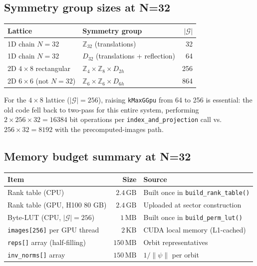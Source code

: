 \documentclass[11pt,a4paper]{article}
\begin{document}
\subsection{Symmetry group sizes at N=32}

\begin{center}
\begin{tabular}{@{}llr@{}}
\toprule
Lattice & Symmetry group & $|\mathcal{G}|$ \\
\midrule
1D chain $N=32$ & $\mathbb{Z}_{32}$ (translations) & 32 \\
1D chain $N=32$ & $D_{32}$ (translations + reflection) & 64 \\
2D $4\times8$ rectangular & $\mathbb{Z}_4\times\mathbb{Z}_8\times D_{2h}$ & 256 \\
2D $6\times6$ (not $N=32$) & $\mathbb{Z}_6\times\mathbb{Z}_6\times D_{6h}$ & 864 \\
\bottomrule
\end{tabular}
\end{center}

For the $4\times8$ lattice ($|\mathcal{G}|=256$), raising \texttt{kMaxGGpu}
from 64 to 256 is essential: the old code fell back to two-pass for this
entire system, performing $2\times256\times32 = 16384$ bit operations per
\texttt{index\_and\_projection} call vs.\ $256\times32 = 8192$ with the
precomputed-images path.

\subsection{Memory budget summary at N=32}

\begin{center}
\begin{tabular}{@{}lrl@{}}
\toprule
Item & Size & Source \\
\midrule
Rank table (CPU) & $2.4\,\mathrm{GB}$ & Built once in \texttt{build\_rank\_table()} \\
Rank table (GPU, H100 80 GB) & $2.4\,\mathrm{GB}$ & Uploaded at sector construction \\
Byte-LUT (CPU, $|\mathcal{G}|=256$) & $1\,\mathrm{MB}$ & Built once in \texttt{build\_perm\_lut()} \\
\texttt{images[256]} per GPU thread & $2\,\mathrm{KB}$ & CUDA local memory (L1-cached) \\
\texttt{reps[]} array (half-filling) & $150\,\mathrm{MB}$ & Orbit representatives \\
\texttt{inv\_norms[]} array & $150\,\mathrm{MB}$ & $1/\|\psi\|$ per orbit \\
\bottomrule
\end{tabular}
\end{center}
\end{document}
